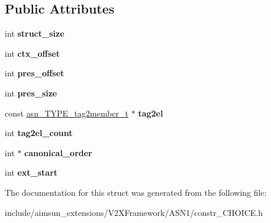 \subsection*{Public Attributes}
\begin{DoxyCompactItemize}
\item 
int {\bfseries struct\+\_\+size}\hypertarget{structasn__CHOICE__specifics__s_aa40f554600038ec1f17cc7490b2e573c}{}\label{structasn__CHOICE__specifics__s_aa40f554600038ec1f17cc7490b2e573c}

\item 
int {\bfseries ctx\+\_\+offset}\hypertarget{structasn__CHOICE__specifics__s_aa90321b4f6ced7891aab6185eb195698}{}\label{structasn__CHOICE__specifics__s_aa90321b4f6ced7891aab6185eb195698}

\item 
int {\bfseries pres\+\_\+offset}\hypertarget{structasn__CHOICE__specifics__s_aa179c52e0644ce78896f64e706996fa3}{}\label{structasn__CHOICE__specifics__s_aa179c52e0644ce78896f64e706996fa3}

\item 
int {\bfseries pres\+\_\+size}\hypertarget{structasn__CHOICE__specifics__s_a07835d7982710686c1c0f78666eff09d}{}\label{structasn__CHOICE__specifics__s_a07835d7982710686c1c0f78666eff09d}

\item 
const \hyperlink{structasn__TYPE__tag2member__s}{asn\+\_\+\+T\+Y\+P\+E\+\_\+tag2member\+\_\+t} $\ast$ {\bfseries tag2el}\hypertarget{structasn__CHOICE__specifics__s_ad05a453c35b133f064676d6e2ecabb53}{}\label{structasn__CHOICE__specifics__s_ad05a453c35b133f064676d6e2ecabb53}

\item 
int {\bfseries tag2el\+\_\+count}\hypertarget{structasn__CHOICE__specifics__s_a744b2883930805a8f15b106a3f307ad8}{}\label{structasn__CHOICE__specifics__s_a744b2883930805a8f15b106a3f307ad8}

\item 
int $\ast$ {\bfseries canonical\+\_\+order}\hypertarget{structasn__CHOICE__specifics__s_a9d9568c539045450cd54d61f9e73bf5e}{}\label{structasn__CHOICE__specifics__s_a9d9568c539045450cd54d61f9e73bf5e}

\item 
int {\bfseries ext\+\_\+start}\hypertarget{structasn__CHOICE__specifics__s_a7760292b23a1aa59936300fe8d9e14fe}{}\label{structasn__CHOICE__specifics__s_a7760292b23a1aa59936300fe8d9e14fe}

\end{DoxyCompactItemize}


The documentation for this struct was generated from the following file\+:\begin{DoxyCompactItemize}
\item 
include/aimsun\+\_\+extensions/\+V2\+X\+Framework/\+A\+S\+N1/constr\+\_\+\+C\+H\+O\+I\+C\+E.\+h\end{DoxyCompactItemize}
